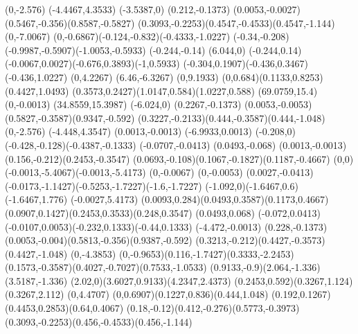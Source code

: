 {    \rlineto(0,-2.576)
    \rlineto(-4.4467,4.3533)
    \rlineto(-3.5387,0)
    \rlineto(0.212,-0.1373)
    \rcurveto(0.0053,-0.0027)(0.5467,-0.356)(0.8587,-0.5827)
    \rcurveto(0.3093,-0.2253)(0.4547,-0.4533)(0.4547,-1.144)
    \rlineto(0,-7.0067)
    \rcurveto(0,-0.6867)(-0.124,-0.832)(-0.4333,-1.0227)
    \rcurveto(-0.34,-0.208)(-0.9987,-0.5907)(-1.0053,-0.5933)
    \rlineto(-0.244,-0.14)
    \rlineto(6.044,0)
    \rlineto(-0.244,0.14)
    \rcurveto(-0.0067,0.0027)(-0.676,0.3893)(-1,0.5933)
    \rcurveto(-0.304,0.1907)(-0.436,0.3467)(-0.436,1.0227)
    \rlineto(0,4.2267)
    \rlineto(6.46,-6.3267)
    \rlineto(0,9.1933)
    \rcurveto(0,0.684)(0.1133,0.8253)(0.4427,1.0493)
    \rcurveto(0.3573,0.2427)(1.0147,0.584)(1.0227,0.588)
    \closepath
    \moveto(69.0759,15.4)%
    \rlineto(0,-0.0013)
    \closepath
    \moveto(34.8559,15.3987)%
    \rlineto(-6.024,0)
    \rlineto(0.2267,-0.1373)
    \rcurveto(0.0053,-0.0053)(0.5827,-0.3587)(0.9347,-0.592)
    \rcurveto(0.3227,-0.2133)(0.444,-0.3587)(0.444,-1.048)
    \rlineto(0,-2.576)
    \rlineto(-4.448,4.3547)
    \rlineto(0.0013,-0.0013)
    \rlineto(-6.9933,0.0013)
    \rcurveto(-0.208,0)(-0.428,-0.128)(-0.4387,-0.1333)
    \rlineto(-0.0707,-0.0413)
    \rlineto(0.0493,-0.068)
    \rcurveto(0.0013,-0.0013)(0.156,-0.212)(0.2453,-0.3547)
    \rcurveto(0.0693,-0.108)(0.1067,-0.1827)(0.1187,-0.4667)
    \rcurveto(0,0)(-0.0013,-5.4067)(-0.0013,-5.4173)
    \rlineto(0,-0.0067)
    \rlineto(0,-0.0053)
    \rlineto(0.0027,-0.0413)
    \rcurveto(-0.0173,-1.1427)(-0.5253,-1.7227)(-1.6,-1.7227)
    \rcurveto(-1.092,0)(-1.6467,0.6)(-1.6467,1.776)
    \rlineto(-0.0027,5.4173)
    \rcurveto(0.0093,0.284)(0.0493,0.3587)(0.1173,0.4667)
    \rcurveto(0.0907,0.1427)(0.2453,0.3533)(0.248,0.3547)
    \rlineto(0.0493,0.068)
    \rlineto(-0.072,0.0413)
    \rcurveto(-0.0107,0.0053)(-0.232,0.1333)(-0.44,0.1333)
    \rlineto(-4.472,-0.0013)
    \rlineto(0.228,-0.1373)
    \rcurveto(0.0053,-0.004)(0.5813,-0.356)(0.9387,-0.592)
    \rcurveto(0.3213,-0.212)(0.4427,-0.3573)(0.4427,-1.048)
    \rlineto(0,-4.3853)
    \rcurveto(0,-0.9653)(0.116,-1.7427)(0.3333,-2.2453)
    \rcurveto(0.1573,-0.3587)(0.4027,-0.7027)(0.7533,-1.0533)
    \rcurveto(0.9133,-0.9)(2.064,-1.336)(3.5187,-1.336)
    \rcurveto(2.02,0)(3.6027,0.9133)(4.2347,2.4373)
    \rcurveto(0.2453,0.592)(0.3267,1.124)(0.3267,2.112)
    \rlineto(0,4.4707)
    \rcurveto(0,0.6907)(0.1227,0.836)(0.444,1.048)
    \rcurveto(0.192,0.1267)(0.4453,0.2853)(0.64,0.4067)
    \rcurveto(0.18,-0.12)(0.412,-0.276)(0.5773,-0.3973)
    \rcurveto(0.3093,-0.2253)(0.456,-0.4533)(0.456,-1.144)
}
